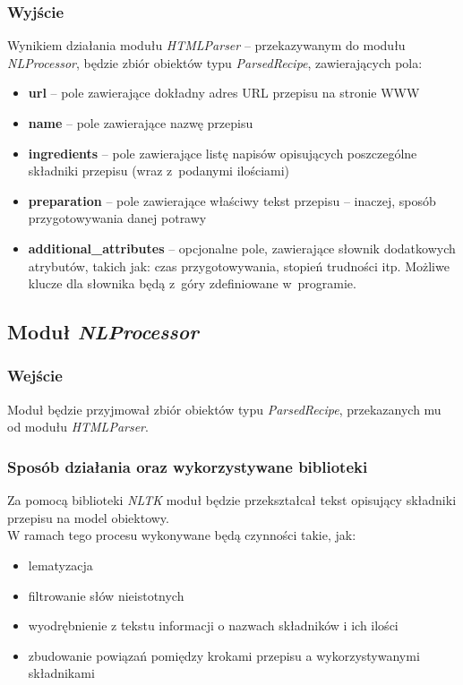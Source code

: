 \documentclass[11pt,a4paper]{article}
\begin{document}
\subsubsection{Wyjście}
Wynikiem działania modułu \textit{HTMLParser} -- przekazywanym do modułu \textit{NLProcessor}, będzie zbiór obiektów typu \textit{ParsedRecipe}, zawierających pola:
\begin{itemize}
  \item \textbf{url} -- pole zawierające dokładny adres URL przepisu na stronie WWW
  \item \textbf{name} -- pole zawierające nazwę przepisu
  \item \textbf{ingredients} -- pole zawierające listę napisów opisujących poszczególne składniki przepisu (wraz z~podanymi ilościami)
  \item \textbf{preparation} -- pole zawierające właściwy tekst przepisu -- inaczej, sposób przygotowywania danej potrawy
  \item \textbf{additional\_attributes} -- opcjonalne pole, zawierające słownik dodatkowych atrybutów, takich jak: czas przygotowywania, stopień trudności itp. Możliwe klucze dla słownika będą z~góry zdefiniowane w~programie.
\end{itemize}

\newpage
\subsection{Moduł \textit{NLProcessor}}
\subsubsection{Wejście}
Moduł będzie przyjmował zbiór obiektów typu \textit{ParsedRecipe}, przekazanych mu od modułu \textit{HTMLParser}.
\subsubsection{Sposób działania oraz wykorzystywane biblioteki}
Za pomocą biblioteki \textit{NLTK} moduł będzie przekształcał tekst opisujący składniki przepisu na model obiektowy.\\ 

W ramach tego procesu wykonywane będą czynności takie, jak:
\begin{itemize}
	\item lematyzacja 
	\item filtrowanie słów nieistotnych
	\item wyodrębnienie z tekstu informacji o nazwach składników i ich ilości
	\item zbudowanie powiązań pomiędzy krokami przepisu a wykorzystywanymi składnikami
\end{itemize}
\end{document}

